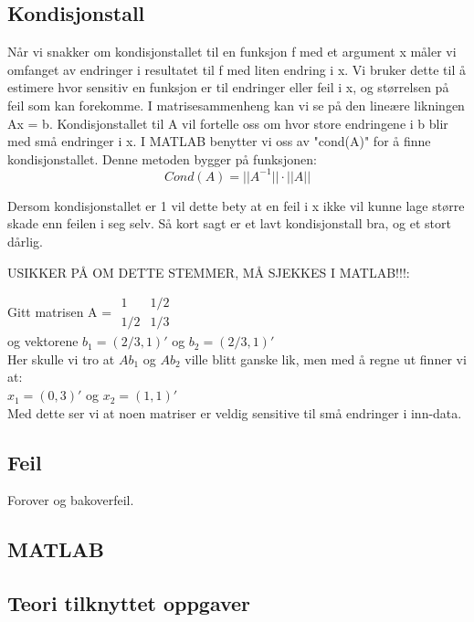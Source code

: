  \subsection{Kondisjonstall}
Når vi snakker om kondisjonstallet til en funksjon f med et argument x måler vi omfanget av endringer i resultatet til f med liten endring i x. Vi bruker dette til å estimere hvor sensitiv en funksjon er til endringer eller feil i x, og størrelsen på feil som kan forekomme. I matrisesammenheng kan vi se på den lineære likningen Ax = b. Kondisjonstallet til A vil fortelle oss om hvor store endringene i b blir med små endringer i x. I MATLAB benytter vi oss av "cond(A)" for å finne kondisjonstallet. Denne metoden bygger på funksjonen:
 \
 \begin{equation}
 Cond(A) = ||A^{-1}|| \cdot ||A||
 \end{equation}
 
Dersom kondisjonstallet er 1 vil dette bety at en feil i x ikke vil kunne lage større skade enn feilen i seg selv. Så kort sagt er et lavt kondisjonstall bra, og et stort dårlig. 

USIKKER PÅ OM DETTE STEMMER, MÅ SJEKKES I MATLAB!!!:

Gitt matrisen A = $\begin{matrix}
 
	1 & 1/2\\
	1/2 & 1/3
	
\end{matrix}$
\\
og vektorene $b_1 = (2/3, 1)'$ og $b_2 = (2/3, 1)'$
\\Her skulle vi tro at $Ab_1$ og $Ab_2$ ville blitt ganske lik, men med å regne ut finner vi at:\\$x_1 = (0, 3)'$ og $x_2 = (1, 1)'$
\\Med dette ser vi at noen matriser er veldig sensitive til små endringer i inn-data.

\subsection{Feil}
Forover og bakoverfeil.

\subsection{MATLAB}

\subsection{Teori tilknyttet oppgaver}
